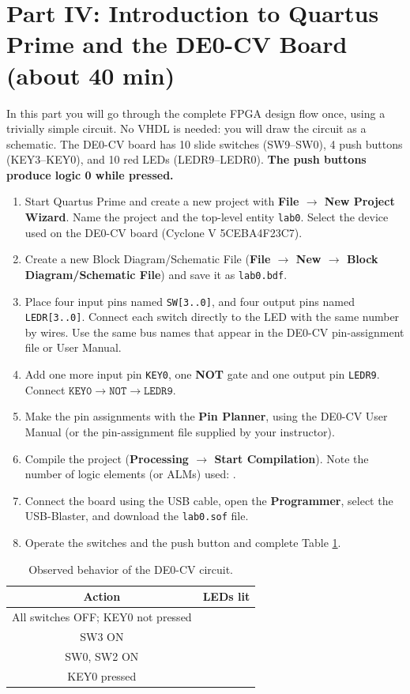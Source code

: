 \documentclass{article}
\begin{document}
\section*{Part IV: Introduction to Quartus Prime and the DE0-CV Board (about 40 min)}

In this part you will go through the complete FPGA design flow once, using a trivially simple circuit. No VHDL is needed: you will draw the circuit as a schematic. The DE0-CV board has 10 slide switches (SW9--SW0), 4 push buttons (KEY3--KEY0), and 10 red LEDs (LEDR9--LEDR0). \textbf{The push buttons produce logic 0 while pressed.}

\begin{enumerate}
    \item Start Quartus Prime and create a new project with \textbf{File $\rightarrow$ New Project Wizard}. Name the project and the top-level entity \texttt{lab0}. Select the device used on the DE0-CV board (Cyclone V 5CEBA4F23C7).
    \item Create a new Block Diagram/Schematic File (\textbf{File $\rightarrow$ New $\rightarrow$ Block Diagram/Schematic File}) and save it as \texttt{lab0.bdf}.
    \item Place four input pins named \texttt{SW[3..0]}, and four output pins named \texttt{LEDR[3..0]}. Connect each switch directly to the LED with the same number by wires. Use the same bus names that appear in the DE0-CV pin-assignment file or User Manual.
    \item Add one more input pin \texttt{KEY0}, one \textbf{NOT} gate and one output pin \texttt{LEDR9}. Connect $\mathtt{KEY0}\rightarrow\mathtt{NOT}\rightarrow\mathtt{LEDR9}$.
    \item Make the pin assignments with the \textbf{Pin Planner}, using the DE0-CV User Manual (or the pin-assignment file supplied by your instructor).
    \item Compile the project (\textbf{Processing $\rightarrow$ Start Compilation}). Note the number of logic elements (or ALMs) used: \underline{\hspace{2cm}}.
    \item Connect the board using the USB cable, open the \textbf{Programmer}, select the USB-Blaster, and download the \texttt{lab0.sof} file.
    \item Operate the switches and the push button and complete Table \ref{tab:de0}.
\end{enumerate}

\begin{table}[H]
    \centering
    \begin{tabular}{|c|c|}
        \hline
        \textbf{Action} & \textbf{LEDs lit} \\
        \hline
        All switches OFF; KEY0 not pressed & \\
        \hline
        SW3 ON & \\
        \hline
        SW0, SW2 ON & \\
        \hline
        KEY0 pressed & \\
        \hline
    \end{tabular}
    \caption{Observed behavior of the DE0-CV circuit.}
    \label{tab:de0}
\end{table}
\end{document}
